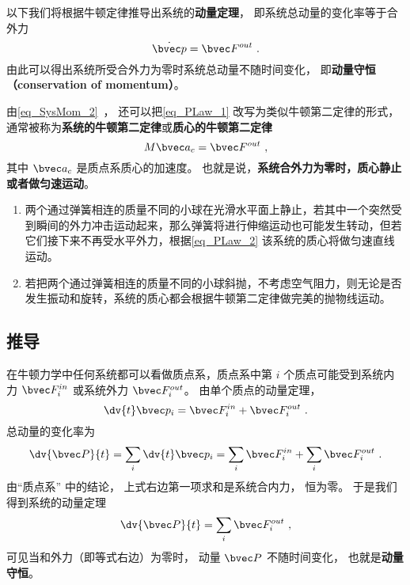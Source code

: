 
以下我们将根据牛顿定律推导出系统的\textbf{动量定理}， 即系统总动量的变化率等于合外力
\begin{equation}\label{eq_PLaw_1}
\dot {\bvec p} = \bvec F^{out}~.
\end{equation}
由此可以得出系统所受合外力为零时系统总动量不随时间变化， 即\textbf{动量守恒（conservation of momentum）}。

由\autoref{eq_SysMom_2}~， 还可以把\autoref{eq_PLaw_1} 改写为类似牛顿第二定律的形式， 通常被称为\textbf{系统的牛顿第二定律}或\textbf{质心的牛顿第二定律}
\begin{equation}\label{eq_PLaw_2}
M \bvec a_c = \bvec F^{out}~,
\end{equation}
其中 $\bvec a_c$ 是质点系质心的加速度。 也就是说，\textbf{系统合外力为零时，质心静止或者做匀速运动}。

\begin{example}{}
\begin{enumerate}
\item 两个通过弹簧相连的质量不同的小球在光滑水平面上静止，若其中一个突然受到瞬间的外力冲击运动起来，那么弹簧将进行伸缩运动也可能发生转动，但若它们接下来不再受水平外力，根据\autoref{eq_PLaw_2} 该系统的质心将做匀速直线运动。
\item 若把两个通过弹簧相连的质量不同的小球斜抛，不考虑空气阻力，则无论是否发生振动和旋转，系统的质心都会根据牛顿第二定律做完美的抛物线运动。
\end{enumerate}
\end{example}

\subsection{推导}
在牛顿力学中任何系统都可以看做质点系，质点系中第 $i$ 个质点可能受到系统内力 $\bvec F_i^{in}$ 或系统外力 $\bvec F_i^{out}$。 由单个质点的动量定理，
\begin{equation}
\dv{t} \bvec p_i = \bvec F_i^{in} + \bvec F_i^{out}~.
\end{equation}
总动量的变化率为
\begin{equation}
\dv{\bvec P}{t} = \sum_i \dv{t} \bvec p_i  = \sum_i \bvec F_i^{in}  + \sum_i \bvec F_i^{out}~.
\end{equation}
由“质点系” 中的结论， 上式右边第一项求和是系统合内力， 恒为零。 于是我们得到系统的动量定理
\begin{equation}
\dv{\bvec P}{t} = \sum_i \bvec F_i^{out}~,
\end{equation}
可见当和外力（即等式右边）为零时， 动量 $\bvec P$ 不随时间变化， 也就是\textbf{动量守恒}。

